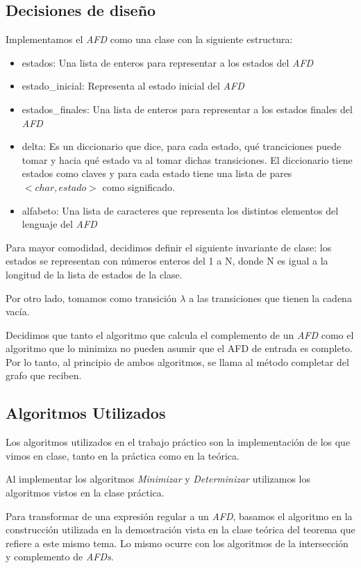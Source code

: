 \subsection{Decisiones de diseño}
Implementamos el \emph{AFD} como una clase con la siguiente estructura:

\begin{itemize}
	\item estados: Una lista de enteros para representar a los estados del \emph{AFD}
	\item estado\_inicial: Representa al estado inicial del \emph{AFD}
	\item estados\_finales: Una lista de enteros para representar a los estados finales del \emph{AFD}
	\item delta: Es un diccionario que dice, para cada estado, qué tranciciones puede tomar y hacia qué estado va al tomar dichas transiciones. El diccionario tiene estados como claves y para cada estado tiene una lista de pares $<char, estado>$ como significado.
	\item alfabeto: Una lista de caracteres que representa los distintos elementos del lenguaje del \emph{AFD}
\end{itemize}

Para mayor comodidad, decidimos definir el siguiente invariante de clase: los estados se representan con números enteros del 1 a N, donde N es igual a la longitud de la lista de estados de la clase.

Por otro lado, tomamos como transición $\lambda$ a las transiciones que tienen la cadena vacía.

Decidimos que tanto el algoritmo que calcula el complemento de un \emph{AFD} como el algoritmo que lo minimiza no pueden asumir que el AFD de entrada es completo. Por lo tanto, al principio de ambos algoritmos, se llama al método completar del grafo que reciben.

\subsection{Algoritmos Utilizados}

Los algoritmos utilizados en el trabajo práctico son la implementación de los que vimos en clase, tanto en la práctica como en la teórica.

Al implementar los algoritmos \emph{Minimizar} y \emph{Determinizar} utilizamos los algoritmos vistos en la clase práctica.

Para transformar de una expresión regular a un \emph{AFD}, basamos el algoritmo en la construcción utilizada en la demostración vista en la clase teórica del teorema que refiere a este mismo tema. Lo mismo ocurre con los algoritmos de la intersección y complemento de \emph{AFDs}.

